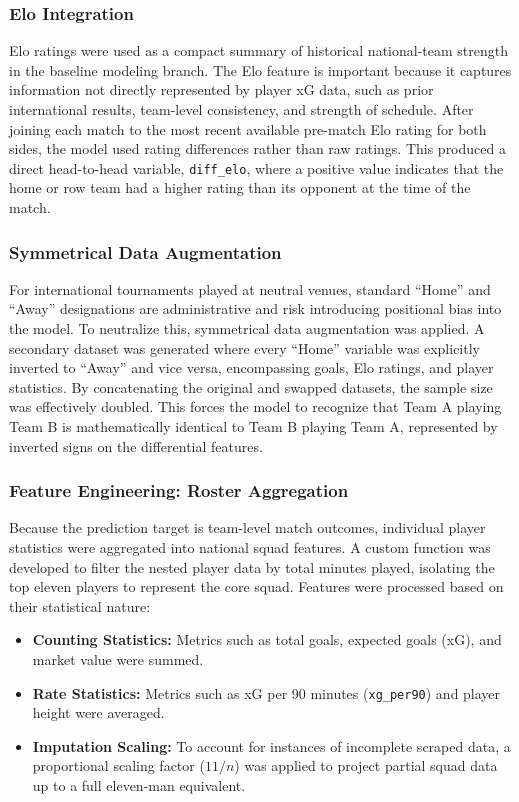 \documentclass[11pt]{article}
\begin{document}
\subsubsection{Elo Integration}
\label{subsec:elo_integration}
Elo ratings were used as a compact summary of historical national-team strength in the baseline modeling branch. The Elo feature is important because it captures information not directly represented by player xG data, such as prior international results, team-level consistency, and strength of schedule. After joining each match to the most recent available pre-match Elo rating for both sides, the model used rating differences rather than raw ratings. This produced a direct head-to-head variable, \texttt{diff\_elo}, where a positive value indicates that the home or row team had a higher rating than its opponent at the time of the match.

\subsubsection{Symmetrical Data Augmentation}
\label{subsec:augmentation}
For international tournaments played at neutral venues, standard ``Home'' and ``Away'' designations are administrative and risk introducing positional bias into the model. To neutralize this, symmetrical data augmentation was applied. A secondary dataset was generated where every ``Home'' variable was explicitly inverted to ``Away'' and vice versa, encompassing goals, Elo ratings, and player statistics. By concatenating the original and swapped datasets, the sample size was effectively doubled. This forces the model to recognize that Team A playing Team B is mathematically identical to Team B playing Team A, represented by inverted signs on the differential features.

\subsubsection{Feature Engineering: Roster Aggregation}
\label{subsec:roster_aggregation}
Because the prediction target is team-level match outcomes, individual player statistics were aggregated into national squad features. A custom function was developed to filter the nested player data by total minutes played, isolating the top eleven players to represent the core squad. Features were processed based on their statistical nature:
\begin{itemize}
    \item \textbf{Counting Statistics:} Metrics such as total goals, expected goals (xG), and market value were summed.
    \item \textbf{Rate Statistics:} Metrics such as xG per 90 minutes (\texttt{xg\_per90}) and player height were averaged.
    \item \textbf{Imputation Scaling:} To account for instances of incomplete scraped data, a proportional scaling factor ($11 / n$) was applied to project partial squad data up to a full eleven-man equivalent.
\end{itemize}
\end{document}
